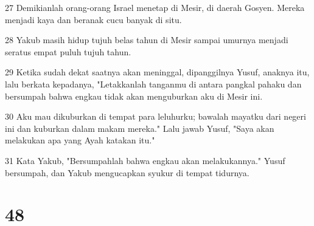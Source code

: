 \par 27 Demikianlah orang-orang Israel menetap di Mesir, di daerah Gosyen. Mereka menjadi kaya dan beranak cucu banyak di situ.
\par 28 Yakub masih hidup tujuh belas tahun di Mesir sampai umurnya menjadi seratus empat puluh tujuh tahun.
\par 29 Ketika sudah dekat saatnya akan meninggal, dipanggilnya Yusuf, anaknya itu, lalu berkata kepadanya, "Letakkanlah tanganmu di antara pangkal pahaku dan bersumpah bahwa engkau tidak akan menguburkan aku di Mesir ini.
\par 30 Aku mau dikuburkan di tempat para leluhurku; bawalah mayatku dari negeri ini dan kuburkan dalam makam mereka." Lalu jawab Yusuf, "Saya akan melakukan apa yang Ayah katakan itu."
\par 31 Kata Yakub, "Bersumpahlah bahwa engkau akan melakukannya." Yusuf bersumpah, dan Yakub mengucapkan syukur di tempat tidurnya.

\chapter{48}

